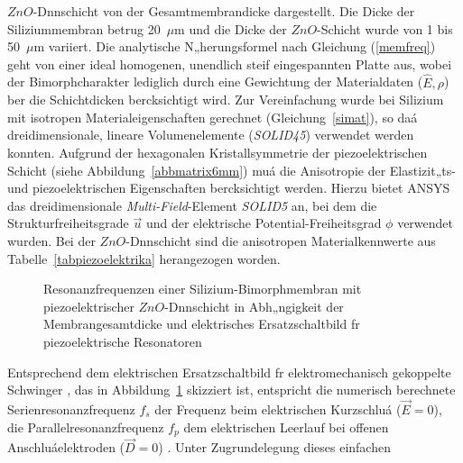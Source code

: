 $ZnO$-Dnnschicht von der Gesamtmembrandicke dargestellt. Die Dicke der
Siliziummembran betrug 20~$\mu$m und die Dicke der $ZnO$-Schicht wurde
von 1 bis 50~$\mu$m variiert. Die analytische N„herungsformel nach
Gleichung (\ref{memfreq}) geht von einer ideal homogenen, unendlich steif
eingespannten Platte aus, wobei der Bimorphcharakter lediglich durch eine
Gewichtung der Materialdaten ($\hat E, \rho$) ber die Schichtdicken
bercksichtigt wird.
Zur Vereinfachung wurde bei Silizium mit isotropen Materialeigenschaften
gerechnet (Gleichung~\ref{simat}), so daá dreidimensionale, lineare
Volumenelemente ({\em SOLID45}) verwendet werden konnten. Aufgrund der
hexagonalen Kristallsymmetrie der piezoelektrischen Schicht
(siehe Abbildung~\ref{abbmatrix6mm}) muá die Anisotropie der Elastizit„ts-
und piezoelektrischen Eigenschaften bercksichtigt werden. Hierzu bietet
{\sf ANSYS} das dreidimensionale {\em Multi-Field}-Element {\em SOLID5} an,
bei dem die Strukturfreiheitsgrade ${\vec u}$ und der elektrische
Potential-Freiheitsgrad $\phi$ verwendet wurden. Bei der $ZnO$-Dnnschicht
sind die anisotropen Materialkennwerte aus Tabelle~\ref{tabpiezoelektrika}
herangezogen worden. \\
\begin{figure}[htb]

\begin{center}

\setabbfzw
\end{center}
\caption{\label{abbvglbulktf}
 Resonanzfrequenzen einer Silizium-Bimorphmembran mit piezoelektrischer
 $ZnO$-Dnnschicht in Abh„ngigkeit der Membrangesamtdicke und elektrisches
 Ersatzschaltbild fr piezoelektrische Resonatoren}
\end{figure}
Entsprechend dem elektrischen Ersatzschaltbild fr elektromechanisch
gekoppelte Schwinger \cite{IEEE}, das in Abbildung~\ref{abbvglbulktf}
skizziert ist, entspricht die numerisch berechnete Serienresonanzfrequenz
$f_{s}$ der Frequenz beim elektrischen Kurzschluá ($\vec E=0$), die
Parallelresonanzfrequenz $f_{p}$ dem elektrischen Leerlauf bei offenen
Anschluáelektroden ($\vec D=0$) \cite{Nai83}. Unter Zugrundelegung dieses
einfachen
